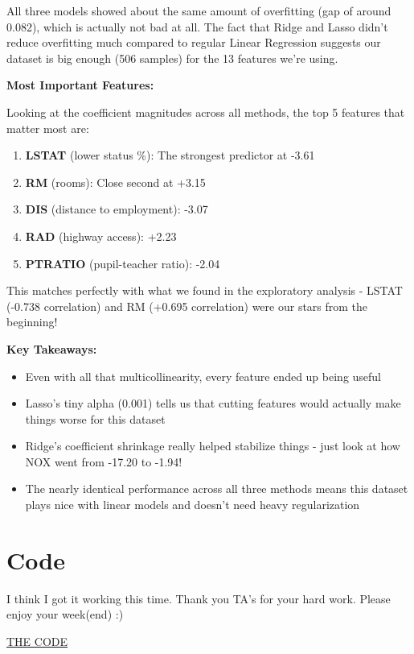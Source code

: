 \documentclass[12pt]{article}
\begin{document}
All three models showed about the same amount of overfitting (gap of around 0.082), 
which is actually not bad at all. The fact that Ridge and Lasso didn't reduce overfitting 
much compared to regular Linear Regression suggests our dataset is big enough (506 samples) 
for the 13 features we're using.

\textbf{Most Important Features:}

Looking at the coefficient magnitudes across all methods, the top 5 features that matter most are:

\begin{enumerate}
    \item \textbf{LSTAT} (lower status \%): The strongest predictor at -3.61
    \item \textbf{RM} (rooms): Close second at +3.15
    \item \textbf{DIS} (distance to employment): -3.07
    \item \textbf{RAD} (highway access): +2.23
    \item \textbf{PTRATIO} (pupil-teacher ratio): -2.04
\end{enumerate}

This matches perfectly with what we found in the exploratory analysis - LSTAT (-0.738 correlation) 
and RM (+0.695 correlation) were our stars from the beginning!

\textbf{Key Takeaways:}

\begin{itemize}
    \item Even with all that multicollinearity, every feature ended up being useful
    \item Lasso's tiny alpha (0.001) tells us that cutting features would actually 
    make things worse for this dataset
    \item Ridge's coefficient shrinkage really helped stabilize things - just look 
    at how NOX went from -17.20 to -1.94!
    \item The nearly identical performance across all three methods means this dataset 
    plays nice with linear models and doesn't need heavy regularization
\end{itemize}

\section{Code}

I think I got it working this time. Thank you TA's for your hard work. Please enjoy your week(end) :)
\begin{center}
    \Large{\href{https://colab.research.google.com/drive/1ZwY5hkh6zIxvTSQysjWt4UU_HUVPftSI?usp=sharing}{THE CODE}}
\end{center}
\end{document}
